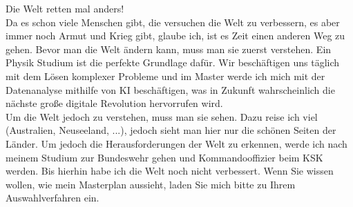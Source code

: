 \documentclass{scrartcl}
\begin{document}
Die Welt retten mal anders!\\
Da es schon viele Menschen gibt, die versuchen die Welt zu verbessern, es aber immer noch Armut und Krieg gibt, glaube ich, ist es Zeit einen anderen Weg zu
gehen. Bevor man die Welt ändern kann, muss man sie zuerst verstehen. Ein Physik Studium ist die perfekte Grundlage dafür. Wir beschäftigen uns täglich mit dem
 Lösen komplexer Probleme und im Master werde ich mich mit der Datenanalyse mithilfe von KI beschäftigen, was in Zukunft wahrscheinlich die nächste große
 digitale Revolution hervorrufen wird.\\
Um die Welt jedoch zu verstehen, muss man sie sehen. Dazu reise ich viel (Australien, Neuseeland, ...), jedoch sieht man hier nur die schönen Seiten der
Länder. Um jedoch die Herausforderungen der Welt zu erkennen, werde ich nach meinem Studium zur Bundeswehr gehen und Kommandooffizier beim KSK werden. Bis
hierhin habe ich die Welt noch nicht verbessert. Wenn Sie wissen wollen, wie mein Masterplan aussieht, laden Sie mich bitte zu Ihrem Auswahlverfahren ein.
\end{document}
